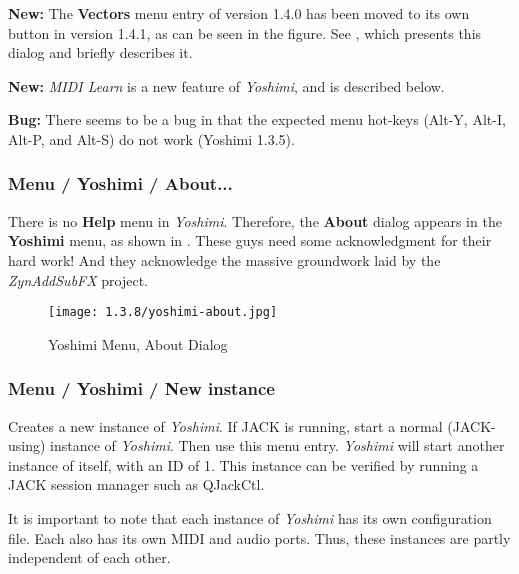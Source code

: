    \textbf{New:}
   The \textbf{Vectors} menu entry of version 1.4.0 has been moved to its own
   button in version 1.4.1, as can be seen in the figure.  See
   , which presents this dialog and
   briefly describes it.

   \textbf{New:}
   \textsl{MIDI Learn} is a new feature of \textsl{Yoshimi}, and is described
   below.

   \textbf{Bug:}
   There seems to be a bug in that the expected menu hot-keys
   (Alt-Y, Alt-I, Alt-P, and Alt-S) do not work (Yoshimi 1.3.5).

\subsubsection{Menu / Yoshimi / About...}
\label{subsubsec:menu_yoshimi_about}

   There is no \textbf{Help} menu in \textsl{Yoshimi}.  Therefore, the
   \textbf{About} dialog appears in the \textbf{Yoshimi} menu, as shown in
   .
   These guys need some acknowledgment for their hard work!
   And they acknowledge the massive groundwork laid by the
   \textsl{ZynAddSubFX} project.

\begin{figure}[H]
   \centering 
   \texttt{[image: 1.3.8/yoshimi-about.jpg]}
   \caption{Yoshimi Menu, About Dialog}
   \label{fig:yoshimi_about_dialog}
\end{figure}

\subsubsection{Menu / Yoshimi / New instance}
\label{subsubsec:menu_yoshimi_new_instance}

   Creates a new instance of \textsl{Yoshimi}.
   If JACK is running,
   start a normal (JACK-using) instance of \textsl{Yoshimi}.
   Then use this menu entry.  \textsl{Yoshimi} will start another instance
   of itself, with an ID of 1.
   This instance can be verified by running a JACK session manager such as
   QJackCtl.

   It is important to note that each instance of \textsl{Yoshimi} has its
   own configuration file.  Each also has its own MIDI and audio ports.
   Thus, these instances are partly independent of each other.

